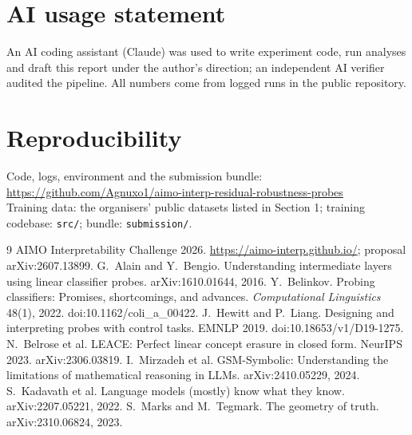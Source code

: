 \documentclass[10pt]{article}
\begin{document}
\section*{AI usage statement}
An AI coding assistant (Claude) was used to write experiment code, run analyses and draft this report under the author's direction; an independent AI verifier audited the pipeline. All numbers come from logged runs in the public repository.

\section*{Reproducibility}
Code, logs, environment and the submission bundle:\\
{\footnotesize\url{https://github.com/Agnuxo1/aimo-interp-residual-robustness-probes}}\\
Training data: the organisers' public datasets listed in Section 1; training codebase: \texttt{src/}; bundle: \texttt{submission/}.

\begin{thebibliography}{9}\small
{} AIMO Interpretability Challenge 2026. \url{https://aimo-interp.github.io/}; proposal arXiv:2607.13899.
 G.~Alain and Y.~Bengio. Understanding intermediate layers using linear classifier probes. arXiv:1610.01644, 2016.
 Y.~Belinkov. Probing classifiers: Promises, shortcomings, and advances. \emph{Computational Linguistics} 48(1), 2022. doi:10.1162/coli\_a\_00422.
 J.~Hewitt and P.~Liang. Designing and interpreting probes with control tasks. EMNLP 2019. doi:10.18653/v1/D19-1275.
 N.~Belrose et al. LEACE: Perfect linear concept erasure in closed form. NeurIPS 2023. arXiv:2306.03819.
 I.~Mirzadeh et al. GSM-Symbolic: Understanding the limitations of mathematical reasoning in LLMs. arXiv:2410.05229, 2024.
 S.~Kadavath et al. Language models (mostly) know what they know. arXiv:2207.05221, 2022.
 S.~Marks and M.~Tegmark. The geometry of truth. arXiv:2310.06824, 2023.
\end{thebibliography}
\end{document}
